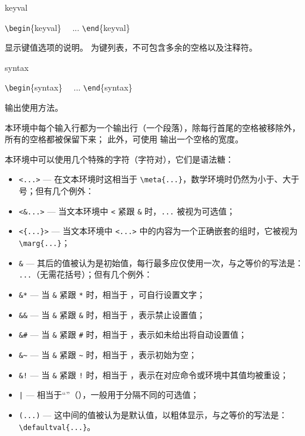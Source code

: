 \documentclass{whudoc}
\begin{document}
\begin{function}[type=environment]{keyval}
\begin{syntax}
  \verb|\begin|\{keyval\}  
  ~~... 
  \verb|\end|\{keyval\}
\end{syntax}
显示键值选项的说明。 为键列表，不可包含多余的空格以及注释符。
\end{function}

\begin{function}[type=environment]{syntax}
\begin{syntax}
  \verb|\begin|\{syntax\}
  ~~... 
  \verb|\end|\{syntax\}
\end{syntax}
输出使用方法。

本环境中每个输入行都为一个输出行（一个段落），除每行首尾的空格被移除外，所有的空格都被保留下来；
此外，可使用 \V{~} 输出一个空格的宽度。
\end{function}

本环境中可以使用几个特殊的字符（字符对），它们是语法糖：
\begin{itemize}[nosep]
  \item \verb|<...>| --- 在文本环境时这相当于 \verb|\meta{...}|，数学环境时仍然为小于、大于号；但有几个例外：
  \item \verb|<&...>| --- 当文本环境中 \verb|<| 紧跟 \verb|&| 时，\verb|...| 被视为可选值；
  \item \verb|<{...}>| --- 当文本环境中 \verb|<...>| 中的内容为一个正确嵌套的组时，它被视为 \verb|\marg{...}|；
  \item \verb|&| --- 其后的值被认为是初始值，每行最多应仅使用一次，与之等价的写法是： \verb| ...|（无需花括号）；但有几个例外：
  \item \verb|&*| --- 当 \verb|&| 紧跟 \verb|*| 时，相当于 ，可自行设置文字；
  \item \verb|&&| --- 当 \verb|&| 紧跟 \verb|&| 时，相当于 ，表示禁止设置值；
  \item \verb|&#| --- 当 \verb|&| 紧跟 \verb|#| 时，相当于 ，表示如未给出将自动设置值；
  \item \verb|&~| --- 当 \verb|&| 紧跟 \verb|~| 时，相当于 ，表示初始为空；
  \item \verb|&!| --- 当 \verb|&| 紧跟 \verb|!| 时，相当于 ，表示在对应命令或环境中其值均被重设；
  \item \verb+|+ --- 相当于“\orbar”（），一般用于分隔不同的可选值；
  \item \verb|(...)| --- 这中间的值被认为是默认值，以粗体显示，与之等价的写法是：\\ \verb|\defaultval{...}|。
\end{itemize}
\end{document}
